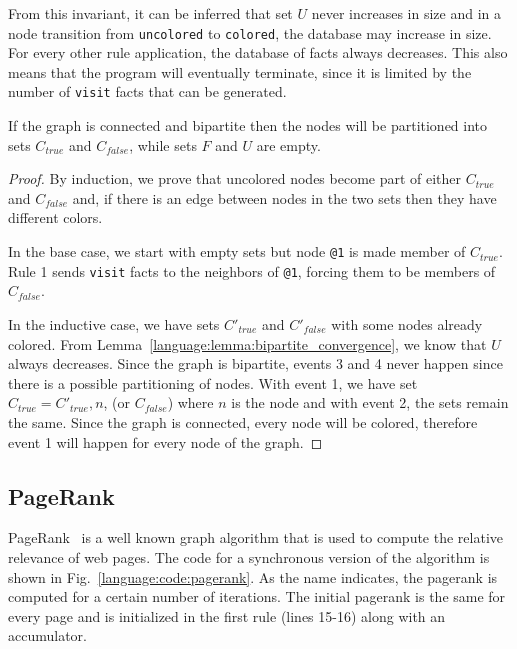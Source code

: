 From this invariant, it can be inferred that set $U$ never increases in size
and in a node transition from \texttt{uncolored} to \texttt{colored}, the
database may increase in size. For every other rule application, the database of
facts always decreases. This also means that the program will eventually
terminate, since it is limited by the number of \texttt{visit} facts that can be
generated.

\begin{theorem}
If the graph is connected and bipartite then the nodes will be partitioned into
sets $C_{true}$ and $C_{false}$, while sets $F$ and $U$ are empty.
\end{theorem}
\begin{proof}
   By induction, we prove that uncolored nodes become part of either $C_{true}$
   and $C_{false}$ and, if there is an edge between nodes in the two sets then
   they have different colors.

   In the base case, we start with empty sets but node \texttt{@1} is made
   member of $C_{true}$. Rule 1 sends \texttt{visit} facts to the neighbors of
   \texttt{@1}, forcing them to be members of $C_{false}$.

   In the inductive case, we have sets $C'_{true}$ and $C'_{false}$ with some
   nodes already colored. From Lemma~\ref{language:lemma:bipartite_convergence},
   we know that $U$ always decreases. Since the graph is bipartite, events 3 and
   4 never happen since there is a possible partitioning of nodes. With event 1,
   we have set $C_{true} = C'_{true}, n$, (or $C_{false}$) where $n$ is the
   node and with event 2, the sets remain the same. Since the graph is
   connected, every node will be colored, therefore event 1 will happen for
   every node of the graph.
\end{proof}

\subsection{PageRank}

PageRank~\cite{Page:2001:MNR} is a well known graph algorithm that is used to
compute the relative relevance of web pages.  The code for a synchronous version
of the algorithm is shown in Fig.~\ref{language:code:pagerank}.  As the name indicates,
the pagerank is computed for a certain number of iterations. The initial
pagerank is the same for every page and is initialized in the first rule (lines
15-16) along with an accumulator.

